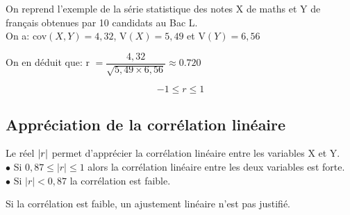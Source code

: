  \begin{example}

 On reprend  l'exemple  de la série statistique des notes X de maths et Y de français obtenues par 10 candidats au Bac L.\\
 
 On a:\; cov$ (X,Y)=4,32 $, \;  V$ (X)=5,49 $\; et \; V$ (Y)=6,56 $
 
 On en déduit que:\;  r $ = \dfrac{4,32}{\sqrt{5,49\times 6,56}}\approx0.720$
 
 \end{example}
 
 \begin{property}
  $$ -1\leq r \leq 1 $$
 \end{property}
 

\subsection*{ Appréciation de la corrélation linéaire }
Le réel $ \left\lvert r \right\rvert $ permet d'apprécier la corrélation
linéaire entre les variables X et Y.\\
  $ \bullet $  Si \; $ 0,87 \leq |r| \leq1  $ \;  alors la corrélation linéaire
entre les deux variables est forte.\\
 $ \bullet $ Si \; $ | r | < 0,87 $  \;  la corrélation est faible.
 
 
 \medskip

 \begin{remark}
 
  Si la corrélation est faible, un
ajustement linéaire n'est pas justifié.
 \end{remark}
   